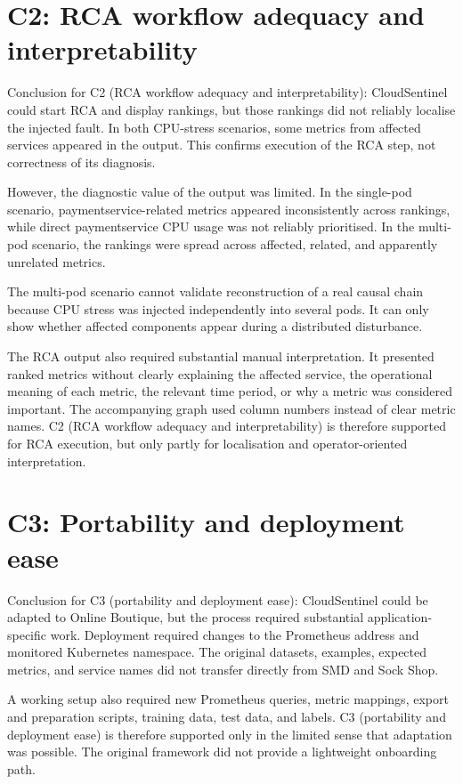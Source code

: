 \section{C2: RCA workflow adequacy and interpretability}
Conclusion for C2 (RCA workflow adequacy and interpretability): CloudSentinel could start RCA and display rankings, but those rankings did not reliably localise the injected fault. In both CPU-stress scenarios, some metrics from affected services appeared in the output. This confirms execution of the RCA step, not correctness of its diagnosis.

However, the diagnostic value of the output was limited. In the single-pod scenario, paymentservice-related metrics appeared inconsistently across rankings, while direct paymentservice CPU usage was not reliably prioritised. In the multi-pod scenario, the rankings were spread across affected, related, and apparently unrelated metrics.

The multi-pod scenario cannot validate reconstruction of a real causal chain because CPU stress was injected independently into several pods. It can only show whether affected components appear during a distributed disturbance.

The RCA output also required substantial manual interpretation. It presented ranked metrics without clearly explaining the affected service, the operational meaning of each metric, the relevant time period, or why a metric was considered important. The accompanying graph used column numbers instead of clear metric names. C2 (RCA workflow adequacy and interpretability) is therefore supported for RCA execution, but only partly for localisation and operator-oriented interpretation.

\section{C3: Portability and deployment ease}
Conclusion for C3 (portability and deployment ease): CloudSentinel could be adapted to Online Boutique, but the process required substantial application-specific work. Deployment required changes to the Prometheus address and monitored Kubernetes namespace. The original datasets, examples, expected metrics, and service names did not transfer directly from SMD and Sock Shop.

A working setup also required new Prometheus queries, metric mappings, export and preparation scripts, training data, test data, and labels. C3 (portability and deployment ease) is therefore supported only in the limited sense that adaptation was possible. The original framework did not provide a lightweight onboarding path.

